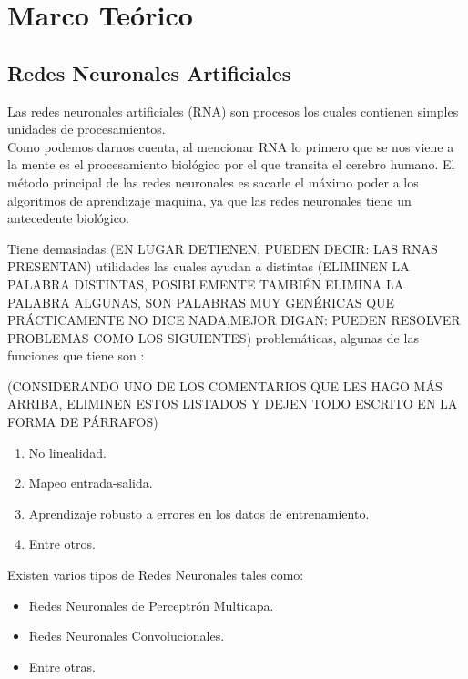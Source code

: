 \section{Marco Teórico}

    
    
    \subsection{Redes Neuronales Artificiales}

        
        Las redes neuronales artificiales (RNA) son procesos los cuales contienen simples unidades de procesamientos. \\
        Como podemos darnos cuenta, al mencionar RNA lo primero que se nos viene a la mente es el procesamiento biol\'ogico por el que transita el 
        cerebro humano. El m\'etodo principal de las redes neuronales es sacarle el máximo poder a los algoritmos de aprendizaje maquina, ya que las redes neuronales 
        tiene un antecedente biol\'ogico.

        Tiene demasiadas (EN LUGAR DETIENEN, PUEDEN DECIR: LAS RNAS PRESENTAN) utilidades las cuales ayudan a distintas (ELIMINEN LA PALABRA DISTINTAS, POSIBLEMENTE TAMBIÉN ELIMINA LA PALABRA ALGUNAS, SON PALABRAS MUY GENÉRICAS QUE PRÁCTICAMENTE NO DICE NADA,MEJOR DIGAN: PUEDEN RESOLVER PROBLEMAS COMO LOS SIGUIENTES) problemáticas, algunas de las funciones que tiene son \cite{liu2015}:

(CONSIDERANDO UNO DE LOS COMENTARIOS QUE LES HAGO MÁS ARRIBA, ELIMINEN ESTOS LISTADOS Y DEJEN TODO ESCRITO EN LA FORMA DE PÁRRAFOS)
        \begin{enumerate}
            \item No linealidad.
            \item Mapeo entrada-salida.
            \item Aprendizaje robusto a errores en los datos de entrenamiento. 
            \item Entre otros.
        \end{enumerate}

        Existen varios tipos de Redes Neuronales tales como: 
        \begin{itemize}
            \item Redes Neuronales de Perceptr\'on Multicapa.
            \item Redes Neuronales Convolucionales.
            \item Entre otras.
        \end{itemize}
    
